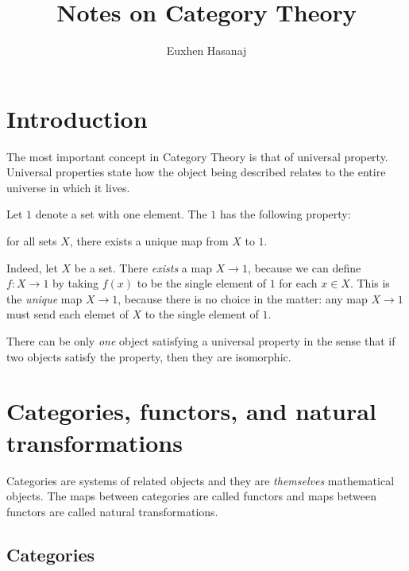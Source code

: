 \documentclass[11pt,a4paper]{article}
\author{Euxhen Hasanaj}
\title{Notes on Category Theory}
\begin{document}
\maketitle

\section{Introduction}
The most important concept in Category Theory is that of universal property. Universal properties state how the object being described relates to the entire universe in which it lives.

\begin{example}
    Let $1$ denote a set with one element. The $1$ has the following property:
\end{example}
\begin{center}
for all sets $X$, there exists a unique map from $X$ to $1$.
\end{center}
Indeed, let $X$ be a set. There \textit{exists} a map $X\to 1$, because we can define $f:X\to 1$ by taking $f(x)$ to be the single element of $1$ for each $x\in X$. This is the \textit{unique} map $X\to 1$, because there is no choice in the matter: any map $X\to 1$ must send each elemet of $X$ to the single element of $1$.

There can be only \textit{one} object satisfying a universal property in the sense that if two objects satisfy the property, then they are isomorphic.

\section{Categories, functors, and natural transformations}
Categories are systems of related objects and they are \textit{themselves} mathematical objects. The maps between categories are called functors and maps between functors are called natural transformations.

\subsection{Categories}
\end{document}
